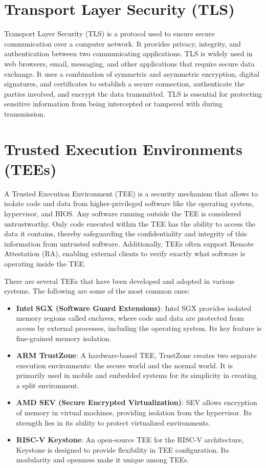 \section{Transport Layer Security (TLS)}
Transport Layer Security (TLS)\cite{rfc8446} is a protocol used to ensure secure communication over a computer network. It provides privacy, integrity, and authentication between two communicating applications. TLS is widely used in web browsers, email, messaging, and other applications that require secure data exchange. It uses a combination of symmetric and asymmetric encryption, digital signatures, and certificates to establish a secure connection, authenticate the parties involved, and encrypt the data transmitted. TLS is essential for protecting sensitive information from being intercepted or tampered with during transmission.

\section{Trusted Execution Environments (TEEs)}
A Trusted Execution Environment (TEE) is a security mechanism that allows to isolate code and data from higher-privileged software like the operating system, hypervisor, and BIOS. Any software running outside the TEE is considered untrustworthy. Only code executed within the TEE has the ability to access the data it contains, thereby safeguarding the confidentiality and integrity of this information from untrusted software. Additionally, TEEs often support Remote Attestation (RA), enabling external clients to verify exactly what software is operating inside the TEE.

There are several TEEs that have been developed and adopted in various systems. The following are some of the most common ones:

\begin{itemize}
    \item \textbf{Intel SGX (Software Guard Extensions)}\cite{costan2016intel}: Intel SGX provides isolated memory regions called enclaves, where code and data are protected from access by external processes, including the operating system. Its key feature is fine-grained memory isolation.
    
    \item \textbf{ARM TrustZone}\cite{7809736}: A hardware-based TEE, TrustZone creates two separate execution environments: the secure world and the normal world. It is primarily used in mobile and embedded systems for its simplicity in creating a split environment.
    
    \item \textbf{AMD SEV (Secure Encrypted Virtualization)}\cite{amd-sev}: SEV allows encryption of memory in virtual machines, providing isolation from the hypervisor. Its strength lies in its ability to protect virtualized environments.
    
    \item \textbf{RISC-V Keystone}\cite{lee2019keystone}: An open-source TEE for the RISC-V architecture, Keystone is designed to provide flexibility in TEE configuration. Its modularity and openness make it unique among TEEs.
\end{itemize}

